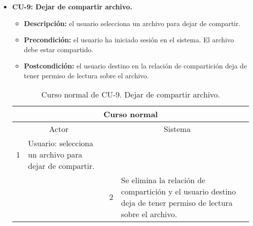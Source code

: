 \begin{itemize}
	\item \textbf{CU-9: Dejar de compartir archivo.}
	\begin{itemize}
		\item \textbf{Descripción:} el usuario selecciona un archivo para dejar de compartir.
		\item \textbf{Precondición:} el usuario ha iniciado sesión en el sistema. El archivo debe estar compartido.
		\item \textbf{Postcondición:} el usuario destino en la relación de compartición deja de tener permiso de lectura sobre el archivo.
	\end{itemize}
	\begin{table}[H]
		\centering
		\begin{tabular}{|p{0.3cm}|p{5cm}|p{0.3cm}|p{5cm}|}
			\hline
			\multicolumn{4}{|c|}{Curso normal} \\ \hline
			\multicolumn{2}{|c|}{Actor} & \multicolumn{2}{|c|}{Sistema} \\ \hline
			1 & Usuario: selecciona un archivo para dejar de compartir. &  &  \\ \hline
			&  & 2 & Se elimina la relación de compartición y el usuario destino deja de tener permiso de lectura sobre el archivo. \\ \hline
		\end{tabular}
		\caption{Curso normal de CU-9. Dejar de compartir archivo.}
		\label{tabla:cu9-normal}
	\end{table}
\end{itemize}

